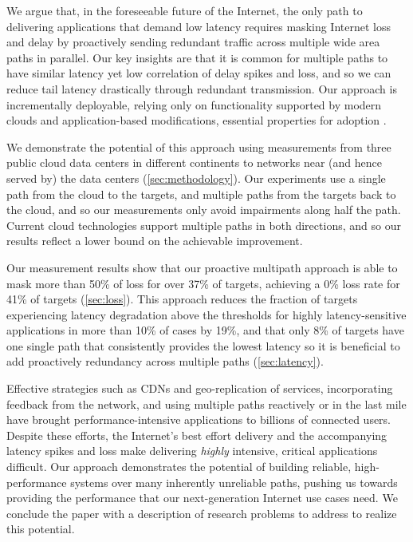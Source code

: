 \documentclass[sigconf,nonacm,screen,letterpaper,10pt]{acmart}
\begin{document}
We argue that, in the foreseeable future of the Internet, the only path
to delivering applications that demand low latency requires masking
Internet loss and delay by proactively sending redundant traffic across
multiple wide area paths in parallel. Our key insights are that it is
common for multiple paths to have similar latency yet low correlation of
delay spikes and loss, and so we can reduce tail latency drastically
through redundant transmission. Our approach is incrementally
deployable, relying only on functionality supported by modern clouds and
application-based modifications, essential properties for adoption
\cite{panrg}.

We demonstrate the potential of this approach using measurements from
three public cloud data centers in different continents to networks near
(and hence served by) the data centers (\cref{sec:methodology}). Our
experiments use a single path from the cloud to the targets, and
multiple paths from the targets back to the cloud, and so our
measurements only avoid impairments along half the path. Current cloud
technologies support multiple paths in both directions, and so our
results reflect a lower bound on the achievable improvement.

Our measurement results show that our proactive multipath approach is
able to mask more than 50\% of loss for over 37\% of targets, achieving
a 0\% loss rate for 41\% of targets (\cref{sec:loss}). This approach
reduces the fraction of targets experiencing latency degradation above
the thresholds for highly latency-sensitive applications in more than
10\% of cases by 19\%, and that only 8\% of targets have one single path
that consistently provides the lowest latency so it is beneficial to add
proactively redundancy across multiple paths (\cref{sec:latency}).

Effective strategies such as CDNs and geo-replication of services,
incorporating feedback from the network, and using multiple paths
reactively or in the last mile have brought performance-intensive
applications to billions of connected users. Despite these efforts, the
Internet's best effort delivery and the accompanying latency spikes and
loss make delivering \emph{highly} intensive, critical applications
difficult. Our approach demonstrates the potential of building reliable,
high-performance systems over many inherently unreliable paths, pushing
us towards providing the performance that our next-generation Internet
use cases need. We conclude the paper with a description of research
problems to address to realize this potential.
\end{document}
